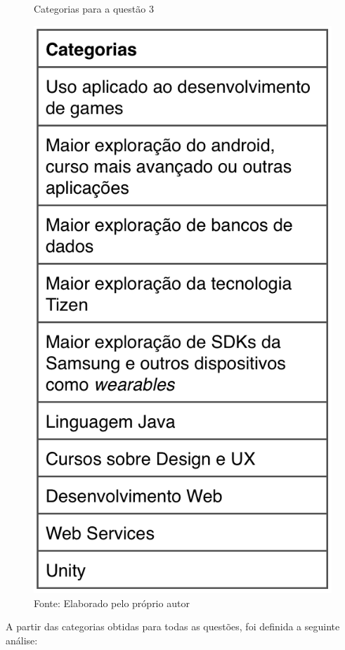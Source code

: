 \begin{figure}[H]
\caption{Categorias para a questão 3}
\centerline{\includegraphics[scale=0.75]{img/categoriasnovidades}}
\label{fig:categoriasnovidades}
\caption* {Fonte: Elaborado pelo próprio autor}
\end{figure}

A partir das categorias obtidas para todas as questões, foi definida a seguinte análise:

